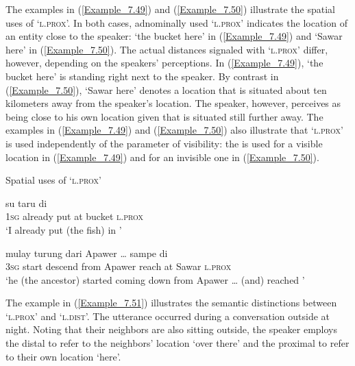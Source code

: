 {The examples in (\ref{Example_7.49}) and (\ref{Example_7.50}) illustrate the spatial uses of  ‘\textsc{l.prox}’. In both cases, adnominally used  ‘\textsc{l.prox}’ indicates the location of an entity close to the speaker:  ‘the bucket here’ in (\ref{Example_7.49}) and  ‘Sawar here’ in (\ref{Example_7.50}). The actual distances signaled with  ‘\textsc{l.prox}’ differ, however, depending on the speakers’ perceptions. In (\ref{Example_7.49}),  ‘the bucket here’ is standing right next to the speaker. By contrast in (\ref{Example_7.50}),  ‘Sawar here’ denotes a location that is situated about ten kilometers away from the speaker’s location. The speaker, however, perceives  as being close to his own location given that  is situated still further away. The examples in (\ref{Example_7.49}) and (\ref{Example_7.50}) also illustrate that  ‘\textsc{l.prox}’ is used independently of the parameter of visibility: the  is used for a visible location in (\ref{Example_7.49}) and for an invisible one in (\ref{Example_7.50}).


\begin{styleExampleTitle}
Spatial uses of  ‘\textsc{l.prox}’
\end{styleExampleTitle}

\ea
\label{Example_7.49}
 {su} {taru} {di} {} {}\\ %
 \textsc{1sg}  already  put  at  bucket  \textsc{l.prox}\\
\glt 
‘I already put (the fish) in ’ \textstyleExampleSource{[080917-006-CvHt.0003]}
\z

\ea
\label{Example_7.50}
 {mulay} {turung} {dari} {Apawer} {\ldots} {sampe} {di} {} {}\\ %
 \textsc{3sg}  start  descend  from  Apawer   { }  reach  at  Sawar  \textsc{l.prox}\\
\glt 
‘he (the ancestor) started coming down from Apawer {\ldots} (and) reached ’ \textstyleExampleSource{[080922-010a-CvNF.0149]}
\z



The example in (\ref{Example_7.51}) illustrates the semantic distinctions between  ‘\textsc{l.prox}’ and  ‘\textsc{l.dist}’. The utterance occurred during a conversation outside at night. Noting that their neighbors are also sitting outside, the speaker employs the distal  to refer to the neighbors’ location  ‘over there’ and the proximal  to refer to their own location  ‘here’.


}
